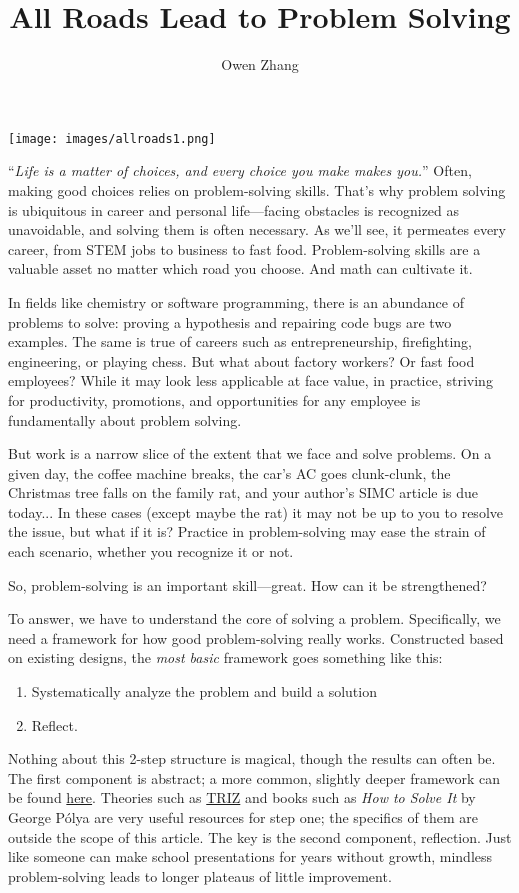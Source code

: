 \documentclass{article}
\title{All Roads Lead to Problem Solving}
\author{Owen Zhang}
\begin{document}
\maketitle
\begin{center}
    \texttt{[image: images/allroads1.png]}
\end{center}

“\textit{Life is a matter of choices, and every choice you make makes you.}” Often, making good choices relies on problem-solving skills. That’s why problem solving is ubiquitous in career and personal life—facing obstacles is recognized as unavoidable, and solving them is often necessary. As we’ll see, it permeates every career, from STEM jobs to business to fast food. Problem-solving skills are a valuable asset no matter which road you choose. And math can cultivate it.

In fields like chemistry or software programming, there is an abundance of problems to solve: proving a hypothesis and repairing code bugs are two examples. The same is true of careers such as entrepreneurship, firefighting, engineering, or playing chess. But what about factory workers? Or fast food employees? While it may look less applicable at face value, in practice, striving for productivity, promotions, and opportunities for any employee is fundamentally about problem solving. 

But work is a narrow slice of the extent that we face and solve problems. On a given day, the coffee machine breaks, the car’s AC goes clunk-clunk, the Christmas tree falls on the family rat, and your author’s SIMC article is due today... In these cases (except maybe the rat) it may not be up to you to resolve the issue, but what if it is? Practice in problem-solving may ease the strain of each scenario, whether you recognize it or not.

So, problem-solving is an important skill—great. How can it be strengthened?

To answer, we have to understand the core of solving a problem. Specifically, we need a framework for how good problem-solving really works. Constructed based on existing designs, the \textit{most basic} framework goes something like this:
\begin{enumerate}
    \item Systematically analyze the problem and build a solution
    \item Reflect.
\end{enumerate}

Nothing about this 2-step structure is magical, though the results can often be. The first component is abstract; a more common, slightly deeper framework can be found \href{https://asq.org/quality-resources/problem-solving}{here}. Theories such as \href{https://en.wikipedia.org/wiki/TRIZ}{TRIZ} and books such as \textit{How to Solve It} by George Pólya are very useful resources for step one; the specifics of them are outside the scope of this article. The key is the second component, reflection. Just like someone can make school presentations for years without growth, mindless problem-solving leads to longer plateaus of little improvement.
\end{document}
